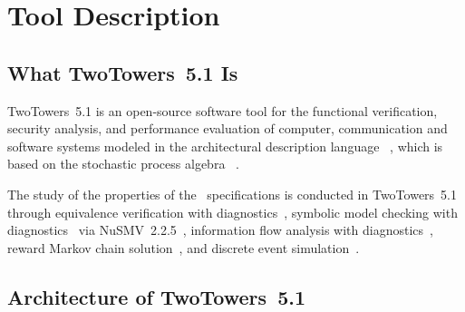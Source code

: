 \chapter{Tool Description}


\section{What TwoTowers~5.1 Is}

TwoTowers~5.1 is an open-source software tool for the functional verification, security analysis, and
performance evaluation of computer, communication and software systems modeled in the architectural
description language \aemilia~\cite{BCD,AB,BDC,BBS}, which is based on the stochastic process algebra
\empagr~\cite{Ber1,BB2,BB1}.

The study of the properties of the \aemilia\ specifications is conducted in TwoTowers~5.1 through 
equivalence verification with diagnostics~\cite{CS}, symbolic model checking with diagnostics~\cite{CGP} via
NuSMV~2.2.5~\cite{CCOPR}, information flow analysis with diagnostics~\cite{FG}, reward Markov chain
solution~\cite{Ste1,How}, and discrete event simulation~\cite{Wel}.



\section{Architecture of TwoTowers~5.1}

